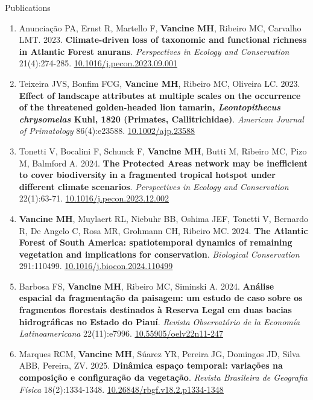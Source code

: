 \documentclass{resume}
\begin{document}
\begin{rSection}{Publications}
\begin{enumerate}
\item Anunciação PA, Ernst R, Martello F, \textbf{Vancine MH}, Ribeiro MC, Carvalho LMT. 2023. \textbf{Climate-driven loss of taxonomic and functional richness in Atlantic Forest anurans}. \textit{Perspectives in Ecology and Conservation} 21(4):274-285. \href{https://doi.org/10.1016/j.pecon.2023.09.001}{\underline{10.1016/j.pecon.2023.09.001}}

\item Teixeira JVS, Bonfim FCG, \textbf{Vancine MH}, Ribeiro MC, Oliveira LC. 2023. \textbf{Effect of landscape attributes at multiple scales on the occurrence of the threatened golden-headed lion tamarin, \textbf{\textit{Leontopithecus chrysomelas}} Kuhl, 1820 (Primates, Callitrichidae)}. \textit{American Journal of Primatology} 86(4):e23588. \href{https://doi.org/10.1002/ajp.23588}{\underline{10.1002/ajp.23588}}

\item Tonetti V, Bocalini F, Schunck F, \textbf{Vancine MH}, Butti M, Ribeiro MC, Pizo M, Balmford A. 2024. \textbf{The Protected Areas network may be inefficient to cover biodiversity in a fragmented tropical hotspot under different climate scenarios}. \textit{Perspectives in Ecology and Conservation} 22(1):63-71. \href{https://doi.org/10.1016/j.pecon.2023.12.002}{\underline{10.1016/j.pecon.2023.12.002}}

\item \textbf{Vancine MH}, Muylaert RL, Niebuhr BB, Oshima JEF, Tonetti V, Bernardo R, De Angelo C, Rosa MR, Grohmann CH, Ribeiro MC. 2024. \textbf{The Atlantic Forest of South America: spatiotemporal dynamics of remaining vegetation and implications for conservation}. \textit{Biological Conservation} 291:110499. \href{https://doi.org/10.1016/j.biocon.2024.110499}{\underline{10.1016/j.biocon.2024.110499}}

\item Barbosa FS, \textbf{Vancine MH}, Ribeiro MC, Siminski A. 2024. \textbf{Análise espacial da fragmentação da paisagem: um estudo de caso sobre os fragmentos florestais destinados à Reserva Legal em duas bacias hidrográficas no Estado do Piauí}. \textit{Revista Observatório de la Economía Latinoamericana} 22(11):e7996. \href{https://doi.org/10.55905/oelv22n11-247}{\underline{10.55905/oelv22n11-247}}

\item Marques RCM, \textbf{Vancine MH}, Súarez YR, Pereira JG, Domingos JD, Silva ABB, Pereira, ZV. 2025. \textbf{Dinâmica espaço temporal: variações na composição e configuração da vegetação}. \textit{Revista Brasileira de Geografia Física} 18(2):1334-1348. \href{https://doi.org/10.26848/rbgf.v18.2.p1334-1348}{\underline{10.26848/rbgf.v18.2.p1334-1348}}


\end{enumerate}
\end{rSection}
\end{document}

